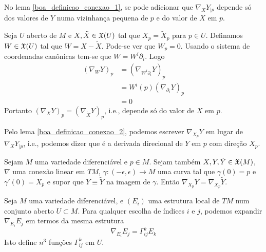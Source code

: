 \begin{lema}\label{boa_definicao_conexao_2}
	No lema \ref{boa_definicao_conexao_1}, se pode adicionar que $\nabla_X Y_{|p}$ depende só dos valores de $Y$ numa vizinhança pequena de $p$ e do valor de $X$ em $p$.
\end{lema}

\begin{demonstracao}
	Seja $U$ aberto de $M$ e $X, \tilde{X} \in \mathfrak{X}(U)$ tal que $X_p = \tilde{X}_p$ para $p \in U$. Definamos $W \in \mathfrak{X}(U)$ tal que $W = X - \tilde{X}$. Pode-se ver que $W_p = 0$. Usando o sistema de coordenadas canônicas tem-se que $W = W^i \partial_i$. Logo
	\begin{align*}
		(\nabla_W Y)_p &= (\nabla_{W^i \partial_i} Y)_p\\
		&=   W^i(p) (\nabla_{\partial_i} Y)_p\\
		&= 0
	\end{align*}
	Portanto $(\nabla_X Y)_p = (\nabla_{\tilde{X}} Y)_p$, i.e., depende só do valor de $X$ em $p$.
\end{demonstracao}

\begin{observacao}
	Pelo lema \ref{boa_definicao_conexao_2}, podemos escrever $\nabla_{X_p} Y$ em lugar de $\nabla_X Y_{|p}$, i.e., podemos dizer que é a derivada direcional de $Y$ em $p$ com direção $X_p$.
\end{observacao}

\begin{lema}\label{conexao-linear-numa-curva}
	Sejam $M$ uma variedade diferenciável e $p \in M$. Sejam também $X, Y, \tilde{Y} \in \mathfrak{X}(M)$, $\nabla$ uma conexão linear em $TM$, $\gamma: (-\epsilon, \epsilon) \rightarrow M$ uma curva tal que $\gamma(0)=p$ e  $\gamma'(0) = X_p$ e supor que $Y \equiv \tilde{Y}$ na imagem de $\gamma$. Então $\nabla_{X_p} Y = \nabla_{X_p} \tilde{Y}$.
\end{lema}

\begin{observacao}\label{obs_simbolos_christoffel}
	Seja $M$ uma variedade diferenciável, e $(E_i)$ uma estrutura local de $TM$ num conjunto aberto $U \subset M$. Para qualquer escolha de índices $i$ e $j$, podemos expandir $\nabla_{E_i} E_j$ em termos da mesma estrutura
	\begin{equation*}
		\nabla_{E_i} E_j = \Gamma^k_{ij} E_k
	\end{equation*}
	Isto define $n^3$ funções $\Gamma^k_{ij}$ em $U$.
\end{observacao}

